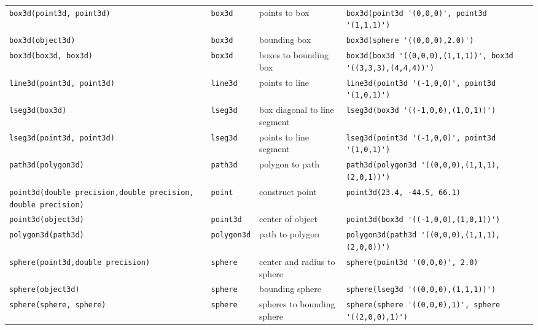\documentclass[10pt]{article}
\begin{document}
\begin{landscape}
\begin{center}
\begin{longtable}{|p{5cm}|l|l|p{12cm}|}
\verb+box3d(point3d, point3d)+ & \verb+box3d+ & points to box & 
	\verb+box3d(point3d '(0,0,0)', point3d '(1,1,1)')+ \\
\verb+box3d(object3d)+ & \verb+box3d+ & bounding box & 
	\verb+box3d(sphere '((0,0,0),2.0)')+ \\
\verb+box3d(box3d, box3d)+ & \verb+box3d+ & boxes to bounding box & 
	\verb+box3d(box3d '((0,0,0),(1,1,1))', box3d '((3,3,3),(4,4,4))')+ \\
\verb+line3d(point3d, point3d)+ & \verb+line3d+ & points to line & 
	\verb+line3d(point3d '(-1,0,0)', point3d '(1,0,1)')+ \\
\verb+lseg3d(box3d)+ & \verb+lseg3d+ & box diagonal to line segment & 
	\verb+lseg3d(box3d '((-1,0,0),(1,0,1))')+ \\
\verb+lseg3d(point3d, point3d)+ & \verb+lseg3d+ & points to line segment & 
	\verb+lseg3d(point3d '(-1,0,0)', point3d '(1,0,1)')+ \\
\verb+path3d(polygon3d)+ & \verb+path3d+ & polygon to path & 
	\verb+path3d(polygon3d '((0,0,0),(1,1,1),(2,0,1))')+ \\
\verb+point3d(double precision,+\newline\hspace*{5mm}\verb+double precision,+
\newline\hspace*{5mm}\verb+double precision)+ & \verb+point+ & construct point & 
	\verb+point3d(23.4, -44.5, 66.1)+ \\
\verb+point3d(object3d)+ & \verb+point3d+ & center of object & 
	\verb+point3d(box3d '((-1,0,0),(1,0,1))')+ \\
\verb+polygon3d(path3d)+ & \verb+polygon3d+ & path to polygon & 
	\verb+polygon3d(path3d '((0,0,0),(1,1,1),(2,0,0))')+ \\
\verb+sphere(point3d,+\newline\hspace*{5mm}\verb+double precision)+ & 
	\verb+sphere+ & center and radius to sphere & \verb+sphere(point3d '(0,0,0)', 2.0)+ \\
\verb+sphere(object3d)+ & \verb+sphere+ & bounding sphere & 
	\verb+sphere(lseg3d '((0,0,0),(1,1,1))')+ \\
\verb+sphere(sphere, sphere)+ & \verb+sphere+ & spheres to bounding sphere & 
	\verb+sphere(sphere '((0,0,0),1)', sphere '((2,0,0),1)')+ \\

\end{longtable}
\end{center}

\end{landscape}
\end{document}
